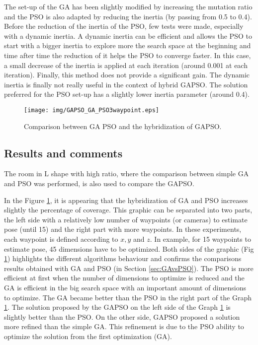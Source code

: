 The set-up of the GA has been slightly modified by increasing the mutation ratio and the PSO is also adapted by reducing the inertia (by passing from 0.5 to 0.4).
 Before the reduction of the inertia of the PSO, few tests were made, especially with a dynamic inertia. A dynamic inertia can be efficient and allows the PSO to start with a bigger inertia to explore more the search space at the beginning and time after time the reduction of it helps the PSO to converge faster. In this case, a small decrease of the inertia is applied at each iteration (around  0.001 at each iteration). Finally, this method does not provide a significant gain. The dynamic inertia is finally  not really useful in the context of hybrid GAPSO. The solution  preferred for the PSO set-up has a slightly lower inertia parameter (around 0.4).

\begin{figure}[t]
  \texttt{[image: img/GAPSO\_GA\_PSO3waypoint.eps]}
  \caption{Comparison between GA PSO and the hybridization of GAPSO.
}\label{fig:GAPSO}
  \endminipage\hfill
\end{figure}

 \subsection{Results and comments }
  

The room in L shape with high ratio, where the comparison between simple GA and PSO was performed, is also used to compare the GAPSO. %

In the Figure \ref{fig:GAPSO}, it is appearing that the hybridization of GA and PSO increases slightly the percentage of coverage. %
 This graphic can be separated into two parts, the left side with a relatively low number of waypoints (or cameras) to estimate pose  (until 15) and the right part with more waypoints. In these experiments, each waypoint is defined according to $x, y$ and $z$. In example, for 15 waypoints to estimate pose, 45 dimensions have to be optimized.
Both sides of the graphic (Fig \ref{fig:GAPSO}) highlights  the different algorithms behaviour and confirms the comparisons results obtained with GA and PSO (in Section \ref{sec:GAvsPSO}).
The PSO is more efficient at first when the number of dimensions to optimize is reduced and the GA is efficient in the big search space with an important amount of dimensions to optimize. The GA became better than the PSO in the right part of the Graph \ref{fig:GAPSO}. 
The solution  proposed by the GAPSO on the left side of the Graph \ref{fig:GAPSO} is slightly better than the PSO. On the other side, GAPSO proposed a solution more refined than the simple GA. This refinement is due to the PSO ability to optimize the solution from the first optimization (GA). 


